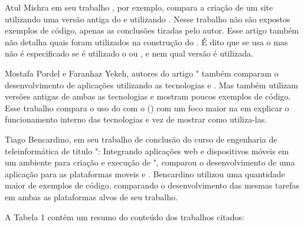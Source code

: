Atul Mishra em seu trabalho , por exemplo, compara a criação de um site utilizando uma versão antiga do  e utilizando . Nesse trabalho não são expostos exemplos de código, apenas as conclusões tiradas pelo autor. Esse artigo também não detalha quais  foram utilizados na construção do . É dito que se usa o  mas não é especificado se é utilizado o  ou , e nem qual versão é utilizada. 

Mostafa Pordel e Faranhaz Yekeh, autores do artigo " também comparam o desenvolvimento de aplicações  utilizando as tecnologias  e . Mas também utilizam versões antigas de ambas as tecnologias e mostram poucos exemplos de código. Esse trabalho compara o uso do  com o  () com um foco maior na em explicar o funcionamento interno das tecnologias e vez de mostrar como utiliza-las.

Tiago Bencardino, em seu trabalho de conclusão do curso de engenharia de teleinformática de titulo ": Integrando aplicações web e dispositivos móveis em um ambiente para criação e execução de ", comparou o desenvolvimento de uma aplicação para as plataformas moveis  e . Bencardino utilizou uma quantidade maior de exemplos de código, comparando o desenvolvimento das mesmas tarefas em ambas as plataformas alvos de seu trabalho.

A Tabela 1 contém um resumo do conteúdo dos trabalhos citados:

\begin{table}[h!]   
    \centering
\end{table}

